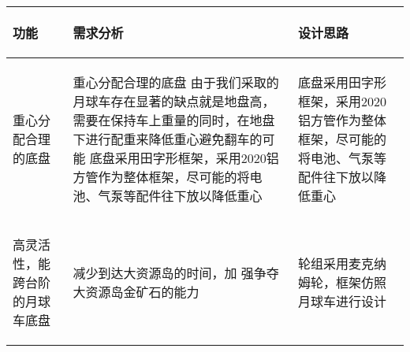 
\begin{longtable}{ p{2cm} | p{7.8cm} | p{6cm} |}

    \hline

    \endfoot
    
    \rowcolor{tabhdcolor}

        \begin{center}
            功能
        \end{center} &
        \begin{center}
            需求分析
        \end{center} &
        \begin{center}
            设计思路
        \end{center} \\

    \hline

    \endhead

        \begin{center}
            重心分配合理的底盘
        \end{center} &
        \begin{center}
            重心分配合理的底盘	由于我们采取的月球车存在显著的缺点就是地盘高，需要在保持车上重量的同时，在地盘下进行配重来降低重心避免翻车的可能	底盘采用田字形框架，采用2020铝方管作为整体框架，尽可能的将电池、气泵等配件往下放以降低重心
        \end{center} &
        \begin{center}
            底盘采用田字形框架，采用2020铝方管作为整体框架，尽可能的将电池、气泵等配件往下放以降低重心
        \end{center} \\
        
    \hline

        \begin{center}
            高灵活性，能跨台阶的月球车底盘
        \end{center} &
        \begin{center}
            减少到达大资源岛的时间，加  强争夺大资源岛金矿石的能力
        \end{center} &
        \begin{center}
            轮组采用麦克纳姆轮，框架仿照月球车进行设计
        \end{center} \\
        

\end{longtable}
